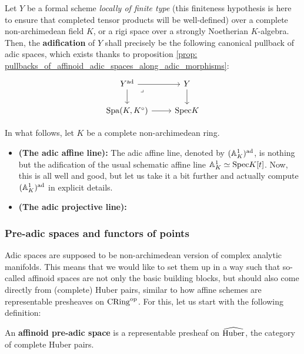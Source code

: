             \begin{definition}[Adification] \label{def: adification}
                Let $Y$ be a formal scheme \textit{locally of finite type} (this finiteness hypothesis is here to ensure that completed tensor products will be well-defined) over a complete non-archimedean field $K$, or a rigi space over a strongly Noetherian $K$-algebra. Then, the \textbf{adification} of $Y$ shall precisely be the following canonical pullback of adic spaces, which exists thanks to proposition \ref{prop: pullbacks_of_affinoid_adic_spaces_along_adic_morphisms}:
                    $$
                        \begin{tikzcd}
                        	{Y^{\ad}} & Y \\
                        	{\Spa(K, K^{\circ})} & {\Spec K}
                        	\arrow[from=2-1, to=2-2]
                        	\arrow[from=1-1, to=2-1]
                        	\arrow[from=1-1, to=1-2]
                        	\arrow["\lrcorner"{anchor=center, pos=0.125}, draw=none, from=1-1, to=2-2]
                        	\arrow[from=1-2, to=2-2]
                        \end{tikzcd}
                    $$
            \end{definition}
            \begin{example} \label{example: adification}
                In what follows, let $K$ be a complete non-archimedean ring.
                \begin{itemize}
                    \item \textbf{(The adic affine line):} The adic affine line, denoted by $(\mathbb{A}^1_K)^{\mathrm{ad}}$, is nothing but the adification of the usual schematic affine line $\mathbb{A}^1_K \simeq \mathrm{Spec} K[t]$. Now, this is all well and good, but let us take it a bit further and actually compute $(\mathbb{A}^1_K)^{\mathrm{ad}}$ in explicit details. 
                    \item \textbf{(The adic projective line):}
                \end{itemize}
            \end{example}
            
        \subsubsection{Pre-adic spaces and functors of points}
            Adic spaces are supposed to be non-archimedean version of complex analytic manifolds. This means that we would like to set them up in a way such that so-called affinoid spaces are not only the basic building blocks, but should also come directly from (complete) Huber pairs, similar to how affine schemes are representable presheaves on $\mathrm{CRing}^{\mathrm{op}}$. For this, let us start with the following definition:
            \begin{definition} \label{def: pre_adic_spaces}
                An \textbf{affinoid pre-adic space} is a representable presheaf on $\widehat{\mathrm{Huber}}$, the category of complete Huber pairs. 
            \end{definition}
            
